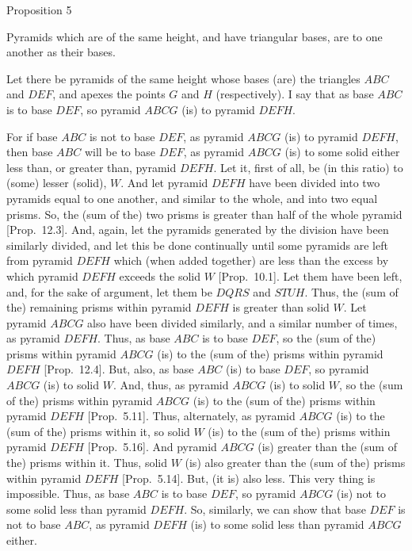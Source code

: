 
\begin{center}
{\large Proposition 5}
\end{center}

Pyramids which are of the same height, and have triangular bases, are to one another
as their bases.

\epsfysize=1.4in
\centerline{}

Let there be pyramids of the same height whose bases (are) the triangles $ABC$ and $DEF$, and apexes the
points $G$ and $H$ (respectively). I say that as base $ABC$ is to base $DEF$, so pyramid $ABCG$
(is) to pyramid $DEFH$.

For if base $ABC$ is not to base $DEF$, as pyramid $ABCG$ (is) to pyramid $DEFH$, then base
$ABC$ will be to base $DEF$, as pyramid $ABCG$ (is) to some solid either less than, or greater
than, pyramid $DEFH$. Let it, first of all, be (in this ratio) to (some) lesser (solid), $W$.
And let pyramid $DEFH$ have been divided into two pyramids equal to one another, and
similar to the whole,  and into two equal prisms. So, the (sum of the) two prisms is greater than
half of the whole pyramid [Prop.~12.3].  And, again, let the pyramids generated
by the division have been similarly divided, and let this be done continually until some pyramids
are left from pyramid $DEFH$ which (when added together) are less than the excess by which pyramid
$DEFH$ exceeds the solid $W$ [Prop.~10.1]. Let them have been left, and, for the sake of argument, let them be $DQRS$ and $STUH$. Thus, the (sum of the) remaining prisms within pyramid $DEFH$ is greater than solid $W$. Let pyramid $ABCG$ also have been divided similarly, and a similar number of times,
as pyramid $DEFH$. Thus, as base $ABC$ is to base $DEF$, so the (sum of the) prisms within pyramid $ABCG$
(is) to the (sum of the) prisms within pyramid $DEFH$ [Prop.~12.4]. But, also, as base
$ABC$ (is) to base $DEF$, so pyramid $ABCG$ (is) to solid $W$. And, thus, as pyramid $ABCG$ (is)
to solid $W$, so the (sum of the) prisms within pyramid $ABCG$ (is) to the (sum of the)
prisms within pyramid $DEFH$ [Prop.~5.11]. Thus, alternately, as pyramid $ABCG$ (is) to the (sum of the) prisms
within it, so solid $W$ (is) to the (sum of the) prisms within pyramid $DEFH$ [Prop.~5.16]. 
And  pyramid $ABCG$ (is) greater than the (sum of the) prisms within it. Thus, solid $W$ (is)
also greater than the (sum of the) prisms within pyramid $DEFH$ [Prop.~5.14]. But,
(it is) also less. This very thing is impossible. Thus, as base $ABC$ is to base $DEF$, so pyramid
$ABCG$ (is) not to some solid less than pyramid $DEFH$. So, similarly, we can show that 
base $DEF$ is not to base $ABC$, as pyramid $DEFH$ (is) to some solid less than pyramid $ABCG$ either.

